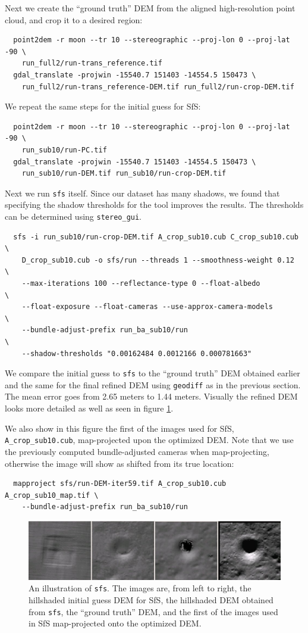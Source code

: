 Next we create the ``ground truth'' DEM from the aligned high-resolution
point cloud, and crop it to a desired region:
\begin{verbatim}
  point2dem -r moon --tr 10 --stereographic --proj-lon 0 --proj-lat -90 \
    run_full2/run-trans_reference.tif
  gdal_translate -projwin -15540.7 151403 -14554.5 150473 \
    run_full2/run-trans_reference-DEM.tif run_full2/run-crop-DEM.tif
\end{verbatim}
We repeat the same steps for the initial guess for SfS:
\begin{verbatim}
  point2dem -r moon --tr 10 --stereographic --proj-lon 0 --proj-lat -90 \
    run_sub10/run-PC.tif
  gdal_translate -projwin -15540.7 151403 -14554.5 150473 \
    run_sub10/run-DEM.tif run_sub10/run-crop-DEM.tif
\end{verbatim}
Next we run \texttt{sfs} itself. Since our dataset has many shadows, we found
that specifying the shadow thresholds for the tool improves the
results. The thresholds can be determined using \texttt{stereo\_gui}.
\begin{verbatim}
  sfs -i run_sub10/run-crop-DEM.tif A_crop_sub10.cub C_crop_sub10.cub \
    D_crop_sub10.cub -o sfs/run --threads 1 --smoothness-weight 0.12  \
    --max-iterations 100 --reflectance-type 0 --float-albedo          \
    --float-exposure --float-cameras --use-approx-camera-models       \
    --bundle-adjust-prefix run_ba_sub10/run                           \
    --shadow-thresholds "0.00162484 0.0012166 0.000781663"
\end{verbatim}
We compare the initial guess to \texttt{sfs} to the ``ground truth'' DEM
obtained earlier and the same for the final refined DEM using
\texttt{geodiff} as in the previous section. The mean error goes from
2.65 meters to 1.44 meters. Visually the refined DEM looks more detailed
as well as seen in figure \ref{fig:sfs2}.

We also show in this figure the first of the images used for SfS,
\verb#A_crop_sub10.cub#, map-projected upon the optimized DEM. Note that
we use the previously computed bundle-adjusted cameras when
map-projecting, otherwise the image will show as shifted from its true
location:
\begin{verbatim}
  mapproject sfs/run-DEM-iter59.tif A_crop_sub10.cub A_crop_sub10_map.tif \
    --bundle-adjust-prefix run_ba_sub10/run
\end{verbatim}
\begin{figure}[h!]
\begin{center}
\includegraphics[width=7in]{images/sfs2.jpg}
\caption[sfs]{An illustration of \texttt{sfs}. The images are, from
  left to right, the hillshaded initial guess DEM for SfS, the hillshaded DEM obtained
from \texttt{sfs}, the ``ground truth'' DEM, and the first of the
images used in SfS map-projected onto the optimized DEM.}
\label{fig:sfs2}
\end{center}
\end{figure}
